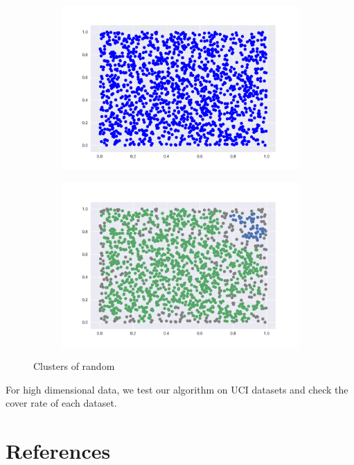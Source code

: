 \documentclass{article}
\begin{document}
\begin{figure}[h!]
	\begin{subfigure}{.5\textwidth}
		\centering
		\includegraphics[width=\linewidth]{r_figure_1.png}
		\caption{}
	\end{subfigure}%
	\begin{subfigure}{.5\textwidth}
		\centering
		\includegraphics[width=\linewidth]{r_figure_2.png}
		\caption{}
	\end{subfigure}
	\caption{Clusters of random}
\end{figure}


\newpage

For high dimensional data, we test our algorithm on UCI datasets and check the cover rate of each dataset.




\section{References}
\end{document}
